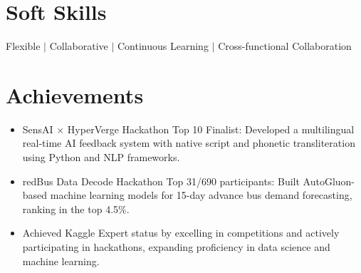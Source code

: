 \documentclass[letterpaper,11pt]{article}
\newcommand{\resumeItem}[1]{
  \item\small{
    {#1 \vspace{-2pt}}
  }
}
\newcommand{\resumeSubHeadingListStart}{\begin{itemize}[leftmargin=0.15in, label={}]}
\newcommand{\resumeSubHeadingListEnd}{\end{itemize}}
\newcommand{\resumeItemListStart}{\begin{itemize}}
\newcommand{\resumeItemListEnd}{\end{itemize}\vspace{-5pt}}
\begin{document}
\section{Soft Skills}
 \begin{itemize}[leftmargin=0.15in, label={}]
    \small{\item{
     Flexible $|$ Collaborative $|$ Continuous Learning $|$ Cross-functional Collaboration \\
    }}
 \end{itemize}
 
\section{Achievements}
\resumeItemListStart
    \resumeItem{SensAI × HyperVerge Hackathon Top 10 Finalist: Developed a multilingual real-time AI feedback system with native script and phonetic transliteration using Python and NLP frameworks.}
    \resumeItem{redBus Data Decode Hackathon Top 31/690 participants: Built AutoGluon-based machine learning models for 15-day advance bus demand forecasting, ranking in the top 4.5\%.}
    \resumeItem{Achieved Kaggle Expert status by excelling in competitions and actively participating in hackathons, expanding proficiency in data science and machine learning.}
\resumeItemListEnd

\end{document}
